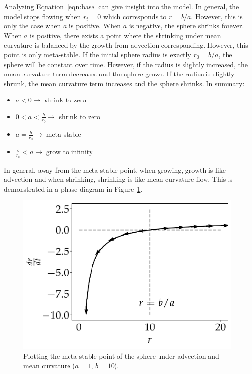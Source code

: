 \documentclass[journal]{IEEEtran}
\begin{document}
Analyzing Equation~\ref{eqn:base} can give insight into the model.
In general, the model stops flowing when $r_t = 0$ which corresponds to $r = b/a$.
However, this is only the case when $a$ is positive.
When $a$ is negative, the sphere shrinks forever.
When $a$ is positive, there exists a point where the shrinking under mean curvature is balanced by the growth from advection corresponding.
However, this point is only meta-stable.
If the initial sphere radius is exactly $r_0 = b/a$, the sphere will be constant over time.
However, if the radius is slightly increased, the mean curvature term decreases and the sphere grows.
If the radius is slightly shrunk, the mean curvature term increases and the sphere shrinks.
In summary:
\begin{itemize}
  \item $a < 0 \rightarrow$ shrink to zero
  \item $0 < a < \frac{b}{r_0} \rightarrow $ shrink to zero
  \item $ a = \frac{b}{r_0} \rightarrow $ meta stable
  \item $\frac{b}{r_0} < a \rightarrow $ grow to infinity
\end{itemize}
In general, away from the meta stable point, when growing, growth is like advection and when shrinking, shrinking is like mean curvature flow.
This is demonstrated in a phase diagram in Figure~\ref{fig:loss}.

\begin{figure}[b]
  \centering
    \includegraphics[width=0.9\linewidth]{loss}%
  \caption{Plotting the meta stable point of the sphere under advection and mean curvature ($a = 1$, $b = 10$).}
  \label{fig:loss}
\end{figure}
\end{document}

